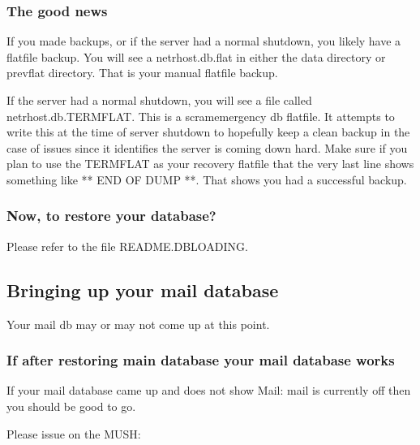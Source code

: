 \documentclass[letterpaper,10pt,english]{sphinxmanual}
\begin{document}
\subsubsection{The good news}
\label{\detokenize{troubleshooting:the-good-news}}
\sphinxAtStartPar
If you made backups, or if the server had a normal shutdown, you
likely have a flatfile backup.  You will see a netrhost.db.flat
in either the \textquotesingle{}data\textquotesingle{} directory or \textquotesingle{}prevflat\textquotesingle{} directory.  That
is your manual flatfile backup.

\sphinxAtStartPar
If the server had a normal shutdown, you will see a file called
netrhost.db.TERMFLAT.  This is a scram\sphinxhyphen{}emergency db flatfile.
It attempts to write this at the time of server shutdown to
hopefully keep a clean backup in the case of issues since
it identifies the server is coming down hard.  Make sure
if you plan to use the TERMFLAT as your recovery flatfile
that the very last line shows something like ** END OF DUMP **.
That shows you had a successful backup.


\subsubsection{Now, to restore your database?}
\label{\detokenize{troubleshooting:now-to-restore-your-database}}
\sphinxAtStartPar
Please refer to the file \textquotesingle{}README.DBLOADING\textquotesingle{}.


\subsection{Bringing up your mail database}
\label{\detokenize{troubleshooting:bringing-up-your-mail-database}}
\sphinxAtStartPar
Your mail db may or may not come up at this point.


\subsubsection{If after restoring main database your mail database works}
\label{\detokenize{troubleshooting:if-after-restoring-main-database-your-mail-database-works}}
\sphinxAtStartPar
If your mail database came up and does not show
\textquotesingle{}Mail: mail is currently off\textquotesingle{} then you should be good to go.

\sphinxAtStartPar
Please issue on the MUSH:

\begin{sphinxVerbatim}[commandchars=\\\{\}]
\end{sphinxVerbatim}
\end{document}
